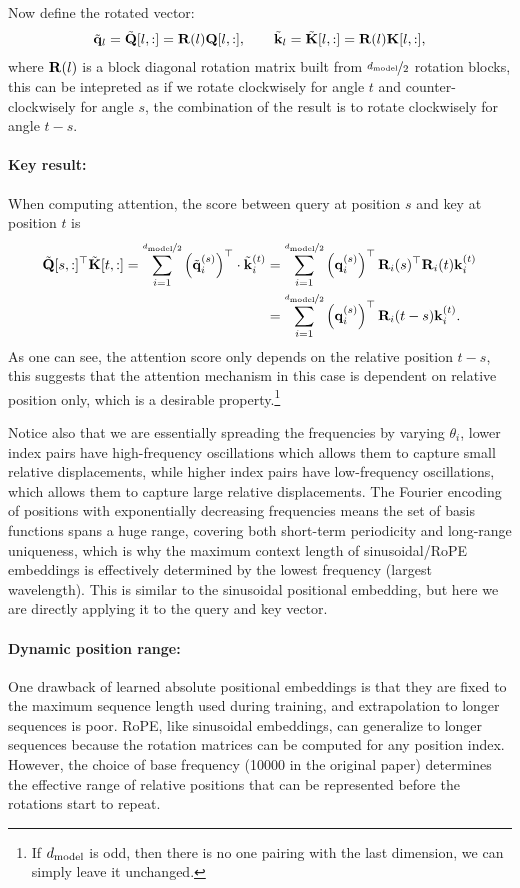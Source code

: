 \documentclass[11pt]{article}  %
\begin{document}
Now define the rotated vector: 
\begin{align}
  \tilde{\mathbf{q}}_l = \tilde{\mathbf{Q}}[l, :] = \mathbf{R}(l)\mathbf{Q}[l, :], \qquad \tilde{\mathbf{k}}_l = \tilde{\mathbf{K}}[l, :] = \mathbf{R}(l)\mathbf{K}[l, :],
\end{align}
where $\mathbf{R}(l)$ is a block diagonal rotation matrix built from $\nicefrac{d_{\text{model}}}{2}$ rotation blocks, this can be intepreted as if we rotate clockwisely for angle $t$ and counter-clockwisely for angle $s$, the combination of the result is to rotate clockwisely for angle $t-s$.

\paragraph{Key result:}
When computing attention, the score between query at position $s$ and key at position $t$ is 
\begin{align}
  \tilde{\mathbf{Q}}[s, :]^{\top}\tilde{\mathbf{K}}[t, :] = \sum_{i=1}^{\nicefrac{d_{\text{model}}}{2}} \left( \tilde{\mathbf{q}}_i^{(s)} \right)^{\top} \cdot \tilde{\mathbf{k}}_i^{(t)} &= \sum_{i=1}^{\nicefrac{d_{\text{model}}}{2}} \left( \mathbf{q}_i^{(s)} \right)^{\top} \mathbf{R}_i(s)^{\top}\mathbf{R}_i(t) \mathbf{k}_i^{(t)}\notag \\
  &= \sum_{i=1}^{\nicefrac{d_{\text{model}}}{2}} \left( \mathbf{q}_i^{(s)} \right)^{\top}\mathbf{R}_i(t - s) \mathbf{k}_i^{(t)}.
\end{align}
As one can see, the attention score only depends on the relative position $t - s$, this suggests that the attention mechanism in this case is dependent on relative position only, which is a desirable property.\footnote{If $d_{\text{model}}$ is odd, then there is no one pairing with the last dimension, we can simply leave it unchanged.}

Notice also that we are essentially spreading the frequencies by varying $\theta_i$, lower index pairs have high-frequency oscillations which allows them to capture small relative displacements, while higher index pairs have low-frequency oscillations, which allows them to capture large relative displacements.
The Fourier encoding of positions with exponentially decreasing frequencies means the set of basis functions spans a huge range, covering both short-term periodicity and long-range uniqueness, which is why the maximum context length of sinusoidal/RoPE embeddings is effectively determined by the lowest frequency (largest wavelength).
This is similar to the sinusoidal positional embedding, but here we are directly applying it to the query and key vector.


\paragraph{Dynamic position range:}
One drawback of learned absolute positional embeddings is that they are fixed to the maximum sequence length used during training, and extrapolation to longer sequences is poor.
RoPE, like sinusoidal embeddings, can generalize to longer sequences because the rotation matrices can be computed for any position index.
However, the choice of base frequency (10000 in the original paper) determines the effective range of relative positions that can be represented before the rotations start to repeat.
\end{document}
